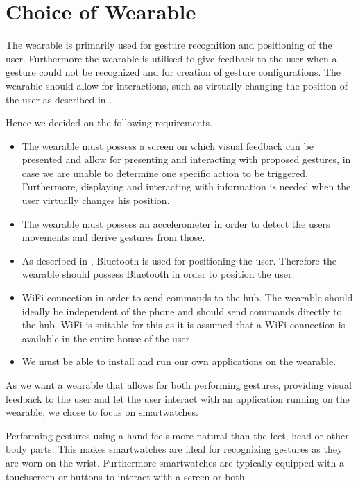 \section{Choice of Wearable}
\label{sec:analysis:choice-of-wearables}

The wearable is primarily used for gesture recognition and positioning of the user. Furthermore the wearable is utilised to give feedback to the user when a gesture could not be recognized and for creation of gesture configurations. The wearable should allow for interactions, such as virtually changing the position of the user as described in .

Hence we decided on the following requirements.

\begin{itemize}
\item The wearable must possess a screen on which visual feedback can be presented and allow for presenting and interacting with proposed gestures, in case we are unable to determine one specific action to be triggered. Furthermore, displaying and interacting with information is needed when the user virtually changes his position.
\item The wearable must possess an accelerometer in order to detect the users movements and derive gestures from those.
\item As described in , Bluetooth is used for positioning the user. Therefore the wearable should possess Bluetooth in order to position the user.
\item WiFi connection in order to send commands to the hub. The wearable should ideally be independent of the phone and should send commands directly to the hub. WiFi is suitable for this as it is assumed that a WiFi connection is available in the entire house of the user.
\item We must be able to install and run our own applications on the wearable.
\end{itemize}

As we want a wearable that allows for both performing gestures, providing visual feedback to the user and let the user interact with an application running on the wearable, we chose to focus on smartwatches.

Performing gestures using a hand feels more natural than the feet, head or other body parts. This makes smartwatches are ideal for recognizing gestures as they are worn on the wrist. Furthermore smartwatches are typically equipped with a touchscreen or buttons to interact with a screen or both.

